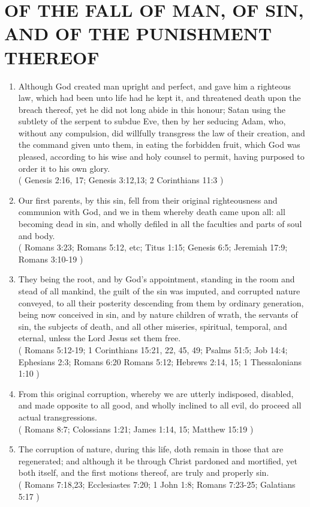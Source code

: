 \documentclass[12pt,a4paper]{book}
\begin{document}
\chapter{OF THE FALL OF MAN, OF SIN, AND OF THE PUNISHMENT THEREOF}
\label{ch-fal}
\begin{enumerate}
\item
\label{ch-fal-1}
Although God created man upright and perfect, and gave him a righteous law, which had been unto life had he kept it, and threatened death upon the breach thereof, yet he did not long abide in this honour; Satan using the subtlety of the serpent to subdue Eve, then by her seducing Adam, who, without any compulsion, did willfully transgress the law of their creation, and the command given unto them, in eating the forbidden fruit, which God was pleased, according to his wise and holy counsel to permit, having purposed to order it to his own glory.\\
( Genesis 2:16, 17; Genesis 3:12,13; 2 Corinthians 11:3 )
\item
\label{ch-fal-2}
Our first parents, by this sin, fell from their original righteousness and communion with God, and we in them whereby death came upon all: all becoming dead in sin, and wholly defiled in all the faculties and parts of soul and body.\\
( Romans 3:23; Romans 5:12, etc; Titus 1:15; Genesis 6:5; Jeremiah 17:9; Romans 3:10-19 )
\item
\label{ch-fal-3}
They being the root, and by God's appointment, standing in the room and stead of all mankind, the guilt of the sin was imputed, and corrupted nature conveyed, to all their posterity descending from them by ordinary generation, being now conceived in sin, and by nature children of wrath, the servants of sin, the subjects of death, and all other miseries, spiritual, temporal, and eternal, unless the Lord Jesus set them free.\\
( Romans 5:12-19; 1 Corinthians 15:21, 22, 45, 49; Psalms 51:5; Job 14:4; Ephesians 2:3; Romans 6:20 Romans 5:12; Hebrews 2:14, 15; 1 Thessalonians 1:10 )
\item
\label{ch-fal-4}
From this original corruption, whereby we are utterly indisposed, disabled, and made opposite to all good, and wholly inclined to all evil, do proceed all actual transgressions.\\
( Romans 8:7; Colossians 1:21; James 1:14, 15; Matthew 15:19 )
\item
\label{ch-fal-5}
The corruption of nature, during this life, doth remain in those that are regenerated; and although it be through Christ pardoned and mortified, yet both itself, and the first motions thereof, are truly and properly sin.\\
( Romans 7:18,23; Ecclesiastes 7:20; 1 John 1:8; Romans 7:23-25; Galatians 5:17 )
\end{enumerate}
\end{document}

